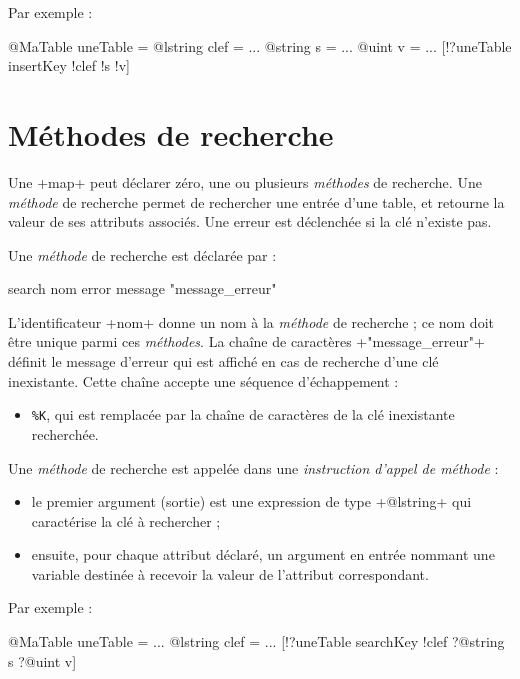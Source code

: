 Par exemple :
\begin{galgas}
@MaTable uneTable = {}
@lstring clef = ...
@string s = ...
@uint v = ...
[!?uneTable insertKey !clef !s !v]
\end{galgas}











\section{Méthodes de recherche}

Une \ggs+map+ peut déclarer zéro, une ou plusieurs \emph{méthodes} de recherche. Une \emph{méthode} de recherche permet de rechercher une entrée d'une table, et retourne la valeur de ses attributs associés. Une erreur est déclenchée si la clé n'existe pas.


Une \emph{méthode} de recherche est déclarée par :


\begin{galgas}
search nom error message "message_erreur"
\end{galgas}

L'identificateur \ggs+nom+ donne un nom à la \emph{méthode} de recherche ; ce nom doit être unique parmi ces \emph{méthodes}. La chaîne de caractères \ggs+"message_erreur"+ définit le message d'erreur qui est affiché en cas de recherche d'une clé inexistante. Cette chaîne accepte une séquence d'échappement :
\begin{itemize}
  \item \texttt{\%K}, qui est remplacée par la chaîne de caractères de la clé inexistante recherchée.
\end{itemize}


Une \emph{méthode} de recherche est appelée dans une \emph{instruction d'appel de méthode} :
\begin{itemize}
  \item le premier argument (sortie) est une expression de type \ggs+@lstring+ qui caractérise la clé à rechercher ;
  \item ensuite, pour chaque attribut déclaré, un argument en entrée nommant une variable destinée à recevoir la valeur de l'attribut correspondant.
\end{itemize}

Par exemple :
\begin{galgas}
@MaTable uneTable = {}
...
@lstring clef = ...
[!?uneTable searchKey !clef ?@string s ?@uint v]
\end{galgas}













